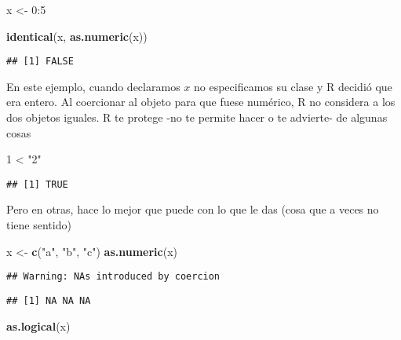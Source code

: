 \documentclass[]{article}
\newenvironment{Shaded}{\begin{snugshade}}{\end{snugshade}}
\newcommand{\KeywordTok}[1]{\textcolor[rgb]{0.13,0.29,0.53}{\textbf{{#1}}}}
\newcommand{\DecValTok}[1]{\textcolor[rgb]{0.00,0.00,0.81}{{#1}}}
\newcommand{\StringTok}[1]{\textcolor[rgb]{0.31,0.60,0.02}{{#1}}}
\newcommand{\NormalTok}[1]{{#1}}
\begin{document}
\begin{Shaded}
\begin{Highlighting}[]
\NormalTok{x <-}\StringTok{ }\DecValTok{0}\NormalTok{:}\DecValTok{5}

\KeywordTok{identical}\NormalTok{(x, }\KeywordTok{as.numeric}\NormalTok{(x))}
\end{Highlighting}
\end{Shaded}

\begin{verbatim}
## [1] FALSE
\end{verbatim}

En este ejemplo, cuando declaramos $x$ no especificamos su clase y R
decidió que era entero. Al coercionar al objeto para que fuese numérico,
R no considera a los dos objetos iguales. R te protege -no te permite
hacer o te advierte- de algunas cosas

\begin{Shaded}
\begin{Highlighting}[]
\DecValTok{1} \NormalTok{<}\StringTok{ "2"}
\end{Highlighting}
\end{Shaded}

\begin{verbatim}
## [1] TRUE
\end{verbatim}

Pero en otras, hace lo mejor que puede con lo que le das (cosa que a
veces no tiene sentido)

\begin{Shaded}
\begin{Highlighting}[]
\NormalTok{x <-}\StringTok{ }\KeywordTok{c}\NormalTok{(}\StringTok{"a"}\NormalTok{, }\StringTok{"b"}\NormalTok{, }\StringTok{"c"}\NormalTok{)}
\KeywordTok{as.numeric}\NormalTok{(x)}
\end{Highlighting}
\end{Shaded}

\begin{verbatim}
## Warning: NAs introduced by coercion
\end{verbatim}

\begin{verbatim}
## [1] NA NA NA
\end{verbatim}

\begin{Shaded}
\begin{Highlighting}[]
\KeywordTok{as.logical}\NormalTok{(x)}
\end{Highlighting}
\end{Shaded}
\end{document}
